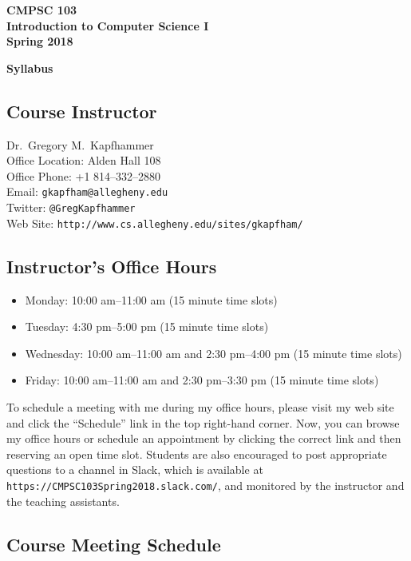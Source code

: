 \documentclass[11pt]{article}
\newcommand{\url}[1]{\lstinline{#1}}
\newcommand{\syllabustitle}[1]
{
  \begin{center}
    \begin{center}
      \bf
      CMPSC 103\\Introduction to Computer Science I\\
      Spring 2018\\
      \medskip
    \end{center}
    \bf
    #1
  \end{center}
}
\begin{document}
\thispagestyle{empty}

\syllabustitle{Syllabus}

\vspace*{-.1in}
\subsection*{Course Instructor}
Dr.\ Gregory M.\ Kapfhammer\\
\noindent Office Location: Alden Hall 108 \\
\noindent Office Phone: +1 814--332--2880 \\
\noindent Email: \url{gkapfham@allegheny.edu} \\
\noindent Twitter: \url{@GregKapfhammer} \\
\noindent Web Site: \url{http://www.cs.allegheny.edu/sites/gkapfham/}

\subsection*{Instructor's Office Hours}

\begin{itemize}
  \itemsep0em

  \item Monday: 10:00 am--11:00 am (15 minute time slots)

  \item Tuesday: 4:30 pm--5:00 pm (15 minute time slots)

  \item Wednesday: 10:00 am--11:00 am and 2:30 pm--4:00 pm (15 minute time slots)

  \item Friday: 10:00 am--11:00 am and 2:30 pm--3:30 pm (15 minute time slots)

\end{itemize}

\vspace*{-.1in}

\noindent To schedule a meeting with me during my office hours, please visit my web site and click the ``Schedule'' link
in the top right-hand corner. Now, you can browse my office hours or schedule an appointment by clicking the correct
link and then reserving an open time slot. Students are also encouraged to post appropriate questions to a channel in
Slack, which is available at \url{https://CMPSC103Spring2018.slack.com/}, and monitored by the instructor and the
teaching assistants.

\subsection*{Course Meeting Schedule}
\end{document}
